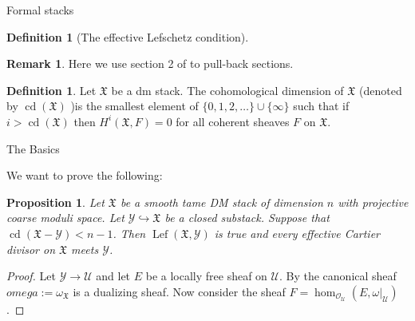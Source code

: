 \documentclass[letterpaper,10pt]{amsart}
\renewcommand{\O}{{\mathcal{O}}}
\newcommand{\UUU}{{\mathcal{U}}}
\newcommand{\Y}{{\mathcal{Y}}}
\newcommand{\fX}{\mathfrak{X}}
\newcommand{\ra}{\rightarrow}
\newcommand{\Lef}{\operatorname{Lef}}
\newcommand{\cd}{\operatorname{cd}}
\newtheorem{proposition}[theorem]{Proposition}
\theoremstyle{definition}
\newtheorem{definition}[theorem]{Definition}
\newtheorem{remark}[theorem]{Remark}
\newtheorem*{proof of (1)}{proof of (1)}
\newtheorem*{proof of (2)}{proof of (2)}
\newtheorem{informal question}[theorem]{Informal Question}
\numberwithin{equation}{section}
\begin{document}
\begin{section}{Formal stacks}
\begin{definition}[The effective Lefschetz condition]
\end{definition}

\begin{remark}
Here we use section 2 of \cite[Section 2]{conrad2005formal} to pull-back sections.
\end{remark}
 

\begin{definition}\label{def:coDim}
Let $\fX$ be a dm stack. The cohomological dimension of $\fX$  (denoted by $\cd(\fX)$ )is the smallest element of
 $\{0,1,2,\ldots\}\cup\{\infty\}$ such that if $i>\cd(\fX)$ then $H^i(\fX,F)=0$ for all coherent sheaves $F$ on $\fX$.
\end{definition}

\end{section}

\begin{section}{The Basics}

We want to prove the following:

\begin{proposition}
Let $\fX$ be a smooth tame DM stack of dimension $n$ with projective coarse moduli space. 
Let $\Y\hookrightarrow \fX$ be a closed substack.
Suppose that $\cd(\fX-\Y)<n-1$. Then $\Lef(\fX,\Y)$ is true and every effective Cartier divisor on $\fX$ meets $\Y$.
\end{proposition}
\begin{proof}
Let $\Y\ra \UUU$ and let $E$ be a locally free sheaf on $\UUU$. By \cite[Theorem 1]{DMSerre} the canonical sheaf 
$omega:=\omega_\fX$ is a dualizing sheaf. Now consider the sheaf $F=\hom_{\O_\UUU}(E,\omega\vert_\UUU)$.
\end{proof}


\end{section}





\end{document}
